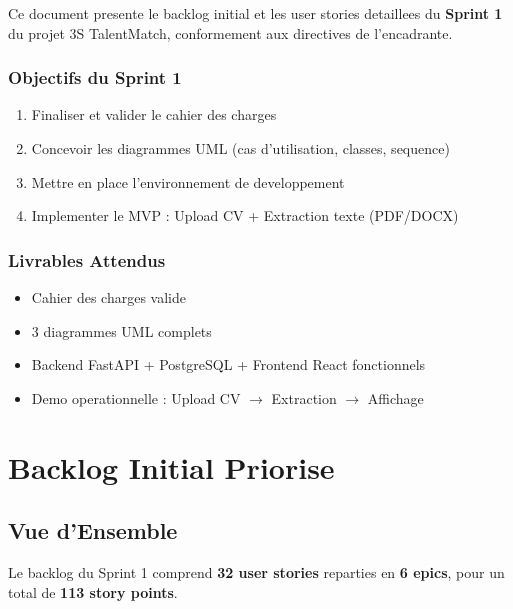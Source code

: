 ﻿\documentclass[12pt,a4paper]{report}
\begin{document}
Ce document presente le backlog initial et les user stories detaillees du \textbf{Sprint 1} du projet 3S TalentMatch, conformement aux directives de l'encadrante.

\subsection*{Objectifs du Sprint 1}
\begin{enumerate}
    \item Finaliser et valider le cahier des charges
    \item Concevoir les diagrammes UML (cas d'utilisation, classes, sequence)
    \item Mettre en place l'environnement de developpement
    \item Implementer le MVP : Upload CV + Extraction texte (PDF/DOCX)
\end{enumerate}

\subsection*{Livrables Attendus}
\begin{itemize}
    \item Cahier des charges valide
    \item 3 diagrammes UML complets
    \item Backend FastAPI + PostgreSQL + Frontend React fonctionnels
    \item Demo operationnelle : Upload CV $\rightarrow$ Extraction $\rightarrow$ Affichage
\end{itemize}

\chapter{Backlog Initial Priorise}

\section{Vue d'Ensemble}

Le backlog du Sprint 1 comprend \textbf{32 user stories} reparties en \textbf{6 epics}, pour un total de \textbf{113 story points}.
\end{document}
